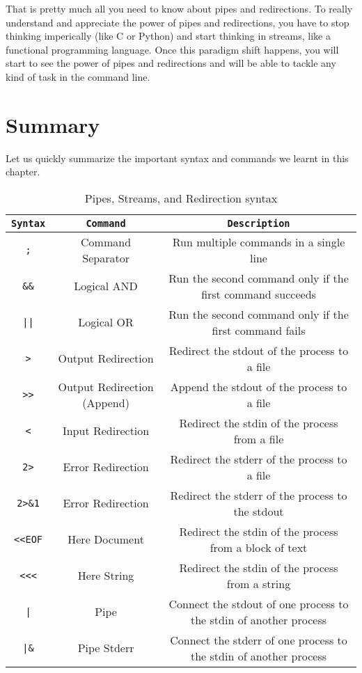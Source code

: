 That is pretty much all you need to know about pipes and redirections.
To really understand and appreciate the power of pipes and redirections,
you have to stop thinking imperically (like C or Python) and start
thinking in streams, like a functional programming language.
Once this paradigm shift happens, you will start to see the power
of pipes and redirections and will be able to tackle any kind of
task in the command line.

\vfill
\pagebreak
\section{Summary}

Let us quickly summarize the important syntax and commands we learnt
in this chapter.

\begin{table*}[h!]
  \caption{Pipes, Streams, and Redirection syntax}
  \begin{tabular}{c c c}
    \toprule
    \texttt{Syntax} & \texttt{Command} & \texttt{Description} \\
    \midrule
    \texttt{;} & Command Separator & Run multiple commands in a single line\\
    \texttt{\&\&} & Logical AND & Run the second command only if the first command succeeds\\
    \texttt{||} & Logical OR & Run the second command only if the first command fails\\
    \texttt{>} & Output Redirection & Redirect the stdout of the process to a file\\
    \texttt{>>} & Output Redirection (Append) & Append the stdout of the process to a file\\
    \texttt{<} & Input Redirection & Redirect the stdin of the process from a file\\
    \texttt{2>} & Error Redirection & Redirect the stderr of the process to a file\\
    \texttt{2>\&1} & Error Redirection & Redirect the stderr of the process to the stdout\\
    \texttt{<<EOF} & Here Document & Redirect the stdin of the process from a block of text\\
    \texttt{<<<} & Here String & Redirect the stdin of the process from a string\\
    \texttt{|} & Pipe & Connect the stdout of one process to the stdin of another process\\
    \texttt{|\&} & Pipe Stderr & Connect the stderr of one process to the stdin of another process\\

\end{tabular}
\end{table*}
